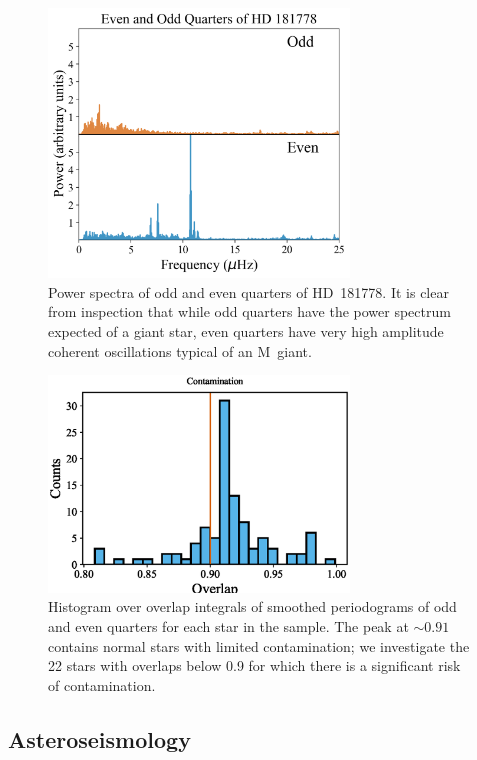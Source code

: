 \documentclass[a4paper,fleqn,usenatbib]{mnras}
\begin{document}
\begin{figure}
\noindent\includegraphics[width=8cm,keepaspectratio]{contam_HD_181778.png}

\caption{\label{contamination}
Power spectra of odd and even quarters of HD~181778. It is clear from inspection that while odd quarters have the power spectrum expected of a giant star, even quarters have very high amplitude coherent oscillations typical of an M~giant.}
\end{figure}


\begin{figure}
\noindent\includegraphics[width=8cm,keepaspectratio]{contam.eps}

\caption{\label{contamination2}
Histogram over overlap integrals of smoothed periodograms of odd and even quarters for each star in the sample. The peak at $\sim 0.91$ contains normal stars with limited contamination; we investigate the 22 stars with overlaps below 0.9 for which there is a significant risk of contamination.}
\end{figure}




\subsection{Asteroseismology}
\label{asteroseismology}
\end{document}
